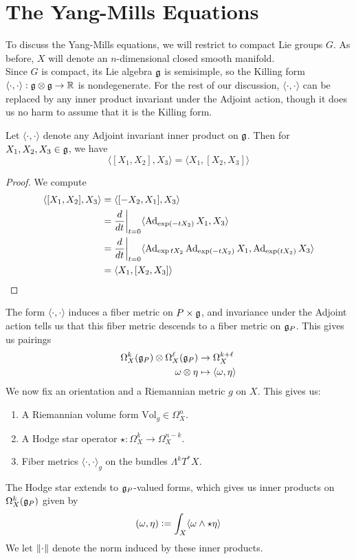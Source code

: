 %
\section{The Yang-Mills Equations}
%
To discuss the Yang-Mills equations, we will restrict to compact Lie groups
$G$. As before, $X$ will denote an $n$-dimensional closed smooth manifold. \\

Since $G$ is compact, its Lie algebra $\mathfrak{g}$ is semisimple, so the Killing
form $\langle\cdot,\cdot\rangle : \mathfrak{g} \otimes \mathfrak{g} \to \mathbb{R}$ is nondegenerate.
For the rest of our discussion, $\langle\cdot,\cdot\rangle$ can be replaced by
any inner product invariant under the Adjoint action, though it does us no
harm to assume that it is the Killing form.
%
\begin{lem}
Let $\langle\cdot,\cdot\rangle$ denote any Adjoint invariant inner product on $\mathfrak{g}$.
Then for $X_1,X_2,X_3 \in \mathfrak{g}$, we have
\[
\langle[X_1,X_2],X_3\rangle = \langle X_1,[X_2,X_3]\rangle
\]
\end{lem}
%
\begin{proof}
We compute
\begin{align*}
\langle[X_1,X_2],X_3\rangle &= \langle[-X_2,X_1],X_3\rangle \\
&= \frac{d}{dt}\bigg\vert_{t=0}\langle\operatorname{Ad}_{\exp(-tX_2)}X_1,X_3\rangle \\
&= \frac{d}{dt}\bigg\vert_{t=0}
\langle\operatorname{Ad}_{\exp{tX_2}}\operatorname{Ad}_{\exp(-tX_2)}X_1,\operatorname{Ad}_{\exp(tX_2)}X_3\rangle \\
&= \langle X_1,[X_2,X_3]\rangle
\end{align*}
\end{proof}
%
The form $\langle\cdot,\cdot\rangle$ induces a fiber metric on
$P \times \mathfrak{g}$, and invariance under the Adjoint action tells us that
this fiber metric descends to a fiber metric on $\mathfrak{g}_P$. This gives
us pairings
\begin{align*}
\Omega^k_X(\mathfrak{g}_P) \otimes \Omega^\ell_X(\mathfrak{g}_P) &\to \Omega^{k+\ell}_X \\
\omega \otimes \eta &\mapsto \langle\omega,\eta\rangle
\end{align*}
We now fix an orientation and a Riemannian metric $g$ on $X$. This gives us:
\begin{enumerate}
  \item A Riemannian volume form $\mathrm{Vol}_g \in \Omega^n_X$.
  \item A Hodge star operator $\star : \Omega^k_X \to \Omega^{n-k}_X$.
  \item Fiber metrics $\langle\cdot,\cdot\rangle_g$ on the bundles
  $\Lambda^kT^*X$.
\end{enumerate}
%
The Hodge star extends to $\mathfrak{g}_P$-valued forms, which gives us inner products
on $\Omega^k_X(\mathfrak{g}_P)$ given by
\[
(\omega,\eta) \vcentcolon= \int_X \langle\omega\wedge\star\eta\rangle
\]
We let $\left\lVert\cdot\right\rVert$ denote the norm induced by these inner products. \\

